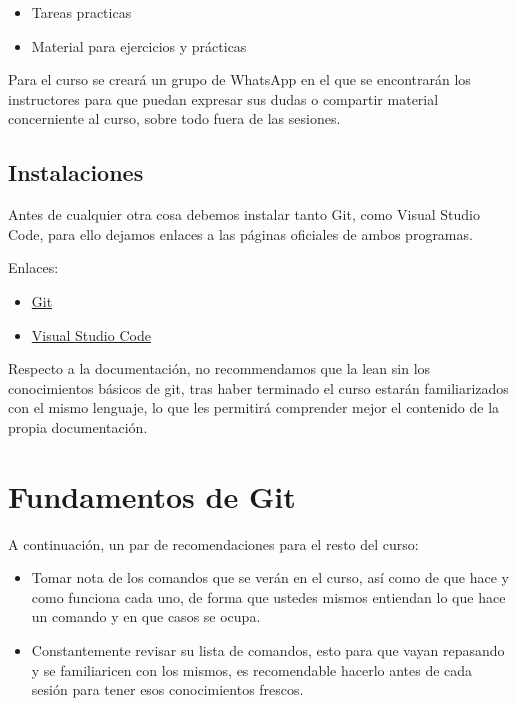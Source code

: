 \documentclass[
]{book}
\begin{document}
\begin{itemize}
\item
  Tareas practicas
\item
  Material para ejercicios y prácticas
\end{itemize}

Para el curso se creará un grupo de WhatsApp en el que se encontrarán los instructores para que puedan expresar sus dudas o compartir material concerniente al curso, sobre todo fuera de las sesiones.

\section{Instalaciones}\label{instalaciones}

Antes de cualquier otra cosa debemos instalar tanto Git, como Visual Studio Code, para ello dejamos enlaces a las páginas oficiales de ambos programas.

Enlaces:

\begin{itemize}
\item
  \href{https://git-scm.com/downloads}{Git}
\item
  \href{https://code.visualstudio.com/download}{Visual Studio Code}
\end{itemize}

Respecto a la documentación, no recommendamos que la lean sin los conocimientos básicos de git, tras haber terminado el curso estarán familiarizados con el mismo lenguaje, lo que les permitirá comprender mejor el contenido de la propia documentación.

\chapter{Fundamentos de Git}\label{fundamentos-de-git}

A continuación, un par de recomendaciones para el resto del curso:

\begin{itemize}
\item
  Tomar nota de los comandos que se verán en el curso, así como de que hace y como funciona cada uno, de forma que ustedes mismos entiendan lo que hace un comando y en que casos se ocupa.
\item
  Constantemente revisar su lista de comandos, esto para que vayan repasando y se familiaricen con los mismos, es recomendable hacerlo antes de cada sesión para tener esos conocimientos frescos.
\end{itemize}
\end{document}
